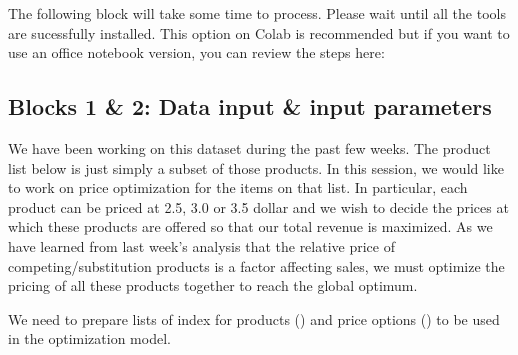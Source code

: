\documentclass[letterpaper,10pt,english]{jupyterBook}
\begin{document}
\sphinxAtStartPar
The following block will take some time to process. Please wait until all the tools are sucessfully installed. This option on Colab is recommended but if you want to use an office notebook version, you can review the steps here: 

\begin{sphinxVerbatim}[commandchars=\\\{\}]
   
  
\end{sphinxVerbatim}


\subsection{Blocks 1 \& 2: Data input \& input parameters}
\label{\detokenize{docs/Case1_4_Module2A_Retail_Price_Optimization:blocks-1-2-data-input-input-parameters}}
\sphinxAtStartPar
We have been working on this dataset during the past few weeks. The product list below is just simply a subset of those products. In this session, we would like to work on price optimization for the items on that list. In particular, each product can be priced at 2.5, 3.0 or 3.5 dollar and we wish to decide the prices at which these products are offered so that our total revenue is maximized. As we have learned from last week’s analysis that the relative price of competing/substitution products is a factor affecting sales, we must optimize the pricing of all these products together to reach the global optimum.

\sphinxAtStartPar
We need to prepare lists of index for products () and price options () to be used in the optimization model.
\end{document}

